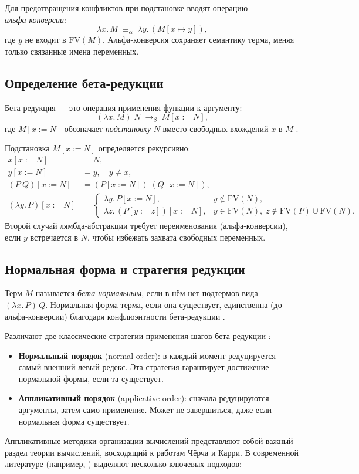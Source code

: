 Для предотвращения конфликтов при подстановке вводят операцию \emph{альфа‑конверсии}: 
\[
  \lambda x.\,M \;\equiv_\alpha\;\lambda y.\,(M[x\mapsto y]),
\]
где \(y\) не входит в \(\mathrm{FV}(M)\). Альфа‑конверсия сохраняет семантику терма, меняя только связанные имена переменных.

\subsection{Определение бета‑редукции}
Бета‑редукция — это операция применения функции к аргументу:
\[
  (\lambda x.\,M)\;N \;\to_\beta\; M[x := N],
\]
где \(M[x := N]\) обозначает \emph{подстановку} \(N\) вместо свободных вхождений \(x\) в \(M\) \cite{Pierce2002}.  

Подстановка \(M[x:=N]\) определяется рекурсивно:
\[
  \begin{aligned}
    x[x:=N] &= N,\\
    y[x:=N] &= y,\quad y\neq x,\\
    (P\ Q)[x:=N] &= (P[x:=N])\;(Q[x:=N]),\\
    (\lambda y.\,P)[x:=N] &=
      \begin{cases}
        \lambda y.\,P[x:=N], & y\notin\mathrm{FV}(N),\\
        \lambda z.\,(P[y:=z])[x:=N], & y\in\mathrm{FV}(N),\; z\notin\mathrm{FV}(P)\cup\mathrm{FV}(N).
      \end{cases}
  \end{aligned}
\]
Второй случай лямбда‑абстракции требует переименования (альфа‑конверсии), если \(y\) встречается в \(N\), чтобы избежать захвата свободных переменных.

\subsection{Нормальная форма и стратегия редукции}
Терм \(M\) называется \emph{бета‑нормальным}, если в нём нет подтермов вида \((\lambda x.\,P)\,Q\). Нормальная форма терма, если она существует, единственна (до альфа‑конверсии) благодаря конфлюэнтности бета‑редукции \cite{ChurchRosser}.  

Различают две классические стратегии применения шагов бета‑редукции \cite{Plotkin1975}:
\begin{itemize}
  \item \textbf{Нормальный порядок} (normal order): в каждый момент редуцируется самый внешний левый редекс. Эта стратегия гарантирует достижение нормальной формы, если та существует.
  \item \textbf{Аппликативный порядок} (applicative order): сначала редуцируются аргументы, затем само применение. Может не завершиться, даже если нормальная форма существует.
\end{itemize}
Аппликативные методики организации вычислений представляют собой важный раздел теории вычислений, восходящий к работам Чёрча и Карри. В современной литературе (например, \cite{Wolfengagen2004}) выделяют несколько ключевых подходов:

